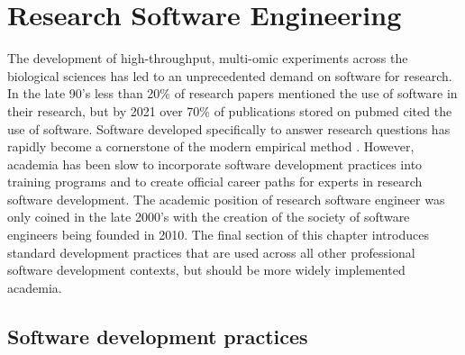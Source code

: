 \documentclass[../main.tex]{subfiles}
\begin{document}
\newpage

\section{Research Software Engineering}

The development of high-throughput, multi-omic experiments across the biological sciences has led to an unprecedented demand on software for research.
In the late 90's less than 20\% of research papers mentioned the use of software in their research, but by 2021 over 70\% of publications stored on pubmed cited the use of software.
Software developed specifically to answer research questions has rapidly become a cornerstone of the modern empirical method \parencite{Schindler2022}.
However, academia has been slow to incorporate software development practices into training programs and to create official career paths for experts in research software development.
The academic position of research software engineer was only coined in the late 2000's \parencite{Prause2010} with the creation of the society of software engineers being founded in 2010. 
The final section of this chapter introduces standard development practices that are used across all other professional software development contexts, but should be more widely implemented academia.

\subsection{Software development practices}



\end{document}
